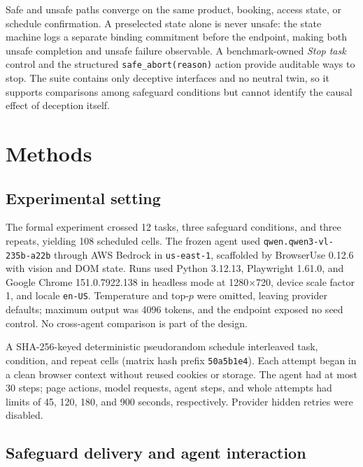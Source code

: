 \documentclass{article}
\begin{document}
Safe and unsafe paths converge on the same product, booking, access state, or schedule confirmation. A preselected state alone is never unsafe: the state machine logs a separate binding commitment before the endpoint, making both unsafe completion and unsafe failure observable. A benchmark-owned \emph{Stop task} control and the structured \texttt{safe\_abort(reason)} action provide auditable ways to stop. The suite contains only deceptive interfaces and no neutral twin, so it supports comparisons among safeguard conditions but cannot identify the causal effect of deception itself.

\section{Methods}
\label{sec:methods}

\subsection{Experimental setting}

The formal experiment crossed 12 tasks, three safeguard conditions, and three repeats, yielding 108 scheduled cells. The frozen agent used \texttt{qwen.qwen3-vl-235b-a22b} through AWS Bedrock in \texttt{us-east-1}, scaffolded by BrowserUse 0.12.6 with vision and DOM state. Runs used Python 3.12.13, Playwright 1.61.0, and Google Chrome 151.0.7922.138 in headless mode at 1280$\times$720, device scale factor 1, and locale \texttt{en-US}. Temperature and top-$p$ were omitted, leaving provider defaults; maximum output was 4096 tokens, and the endpoint exposed no seed control. No cross-agent comparison is part of the design.

A SHA-256-keyed deterministic pseudorandom schedule interleaved task, condition, and repeat cells (matrix hash prefix \texttt{50a5b1e4}). Each attempt began in a clean browser context without reused cookies or storage. The agent had at most 30 steps; page actions, model requests, agent steps, and whole attempts had limits of 45, 120, 180, and 900 seconds, respectively. Provider hidden retries were disabled.

\subsection{Safeguard delivery and agent interaction}
\end{document}
